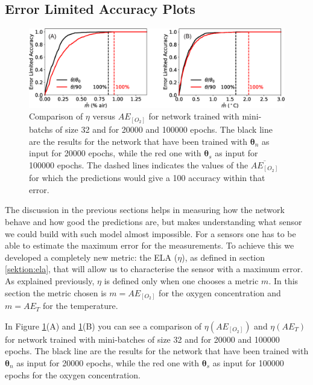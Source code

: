 \documentclass[9pt,twocolumn,twoside,pdftex]{optica}
\begin{document}
\subsection{Error Limited Accuracy Plots}

\begin{figure}[t!]
\centering
\includegraphics[width=15 cm]{ELA_comparison_O2_T.eps}
\caption{Comparison of $\eta$ versus $AE_{[O_2]}$ for network trained with mini-batchs of size 32 and for 20000 and 100000 epochs. The black line are the results for the network that have been trained with ${\pmb \theta}_n$ as input for 20000 epochs, while the red one with ${\pmb \theta}_s$ as input for 100000 epochs. The dashed lines indicates the values of the $\overline{AE_{[O_2]}}$ for which the predictions would give a 100 accuracy within that error.}
\label{fig:ELA_result_comparison}
\end{figure}


The discussion in the previous sections helps in measuring how the network behave and how good the predictions are, but makes understanding what sensor we could build with such model almost impossible. For a sensors one has to be able to estimate the maximum error for the measurements. To achieve this we developed a completely new metric: the ELA ($\eta$), as defined in section \ref{sektion:ela}, that will allow us to characterise the sensor with a maximum error. As explained previously, $\eta$ is defined only when one chooses a metric $m$. In this section the metric chosen is $m=AE_{[O_2]}$ for the oxygen concentration and $m=AE_{T}$ for the temperature.



In Figure \ref{fig:ELA_result_comparison}(A) and \ref{fig:ELA_result_comparison}(B) you can see a comparison of $\eta(AE_{[O_2]})$ and $\eta(AE_{T})$ for network trained with mini-batches of size 32 and for 20000 and 100000 epochs. The black line are the results for the network that have been trained with ${\pmb \theta}_n$ as input for 20000 epochs, while the red one with ${\pmb \theta}_s$ as input for 100000 epochs for the oxygen concentration.
\end{document}
